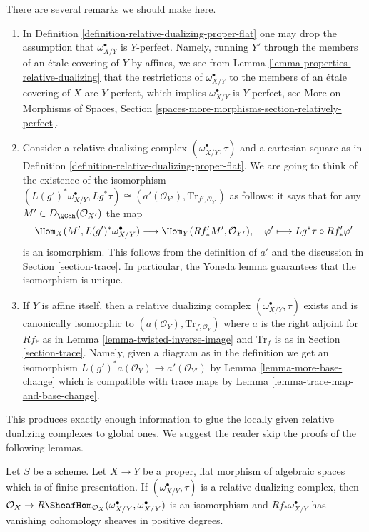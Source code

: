 \noindent
There are several remarks we should make here.
\begin{enumerate}
\item In Definition \ref{definition-relative-dualizing-proper-flat}
one may drop the assumption that $\omega_{X/Y}^\bullet$ is $Y$-perfect.
Namely, running $Y'$ through the members of an \'etale covering of $Y$
by affines, we see from Lemma \ref{lemma-properties-relative-dualizing}
that the restrictions of $\omega_{X/Y}^\bullet$ to the members of
an \'etale covering of $X$ are $Y$-perfect, which implies
$\omega_{X/Y}^\bullet$ is $Y$-perfect, see
More on Morphisms of Spaces, Section
\ref{spaces-more-morphisms-section-relatively-perfect}.
\item Consider a relative dualizing complex
$(\omega_{X/Y}^\bullet, \tau)$ and a cartesian square as in
Definition \ref{definition-relative-dualizing-proper-flat}.
We are going to think of the existence of the isomorphism
$(L(g')^*\omega_{X/Y}^\bullet, Lg^*\tau) \cong
(a'(\mathcal{O}_{Y'}), \text{Tr}_{f', \mathcal{O}_{Y'}})$
as follows: it says that for any $M' \in D_\QCoh(\mathcal{O}_{X'})$
the map
$$
\Hom_X(M', L(g')^*\omega_{X/Y}^\bullet)
\longrightarrow
\Hom_Y(Rf'_*M', \mathcal{O}_{Y'}),\quad
\varphi' \longmapsto Lg^*\tau \circ Rf'_*\varphi'
$$
is an isomorphism. This follows from the definition of $a'$
and the discussion in Section \ref{section-trace}. In particular,
the Yoneda lemma guarantees that the isomorphism is unique.
\item If $Y$ is affine itself, then a relative dualizing complex
$(\omega_{X/Y}^\bullet, \tau)$ exists and is canonically isomorphic
to $(a(\mathcal{O}_Y), \text{Tr}_{f, \mathcal{O}_Y})$ where
$a$ is the right adjoint for $Rf_*$ as in
Lemma \ref{lemma-twisted-inverse-image}
and $\text{Tr}_f$ is as in Section \ref{section-trace}.
Namely, given a diagram as in the definition we get
an isomorphism $L(g')^*a(\mathcal{O}_Y) \to a'(\mathcal{O}_{Y'})$ by
Lemma \ref{lemma-more-base-change}
which is compatible with trace maps by
Lemma \ref{lemma-trace-map-and-base-change}.
\end{enumerate}
This produces exactly enough information to glue the locally given
relative dualizing complexes to global ones. We suggest the reader
skip the proofs of the following lemmas.

\begin{lemma}
\label{lemma-relative-dualizing-RHom}
Let $S$ be a scheme. Let $X \to Y$ be a proper, flat morphism of
algebraic spaces which is of finite presentation.
If $(\omega_{X/Y}^\bullet, \tau)$ is a relative dualizing complex,
then  $\mathcal{O}_X \to
R\SheafHom_{\mathcal{O}_X}(\omega_{X/Y}^\bullet, \omega_{X/Y}^\bullet)$
is an isomorphism and $Rf_*\omega_{X/Y}^\bullet$ has vanishing cohomology
sheaves in positive degrees.
\end{lemma}

